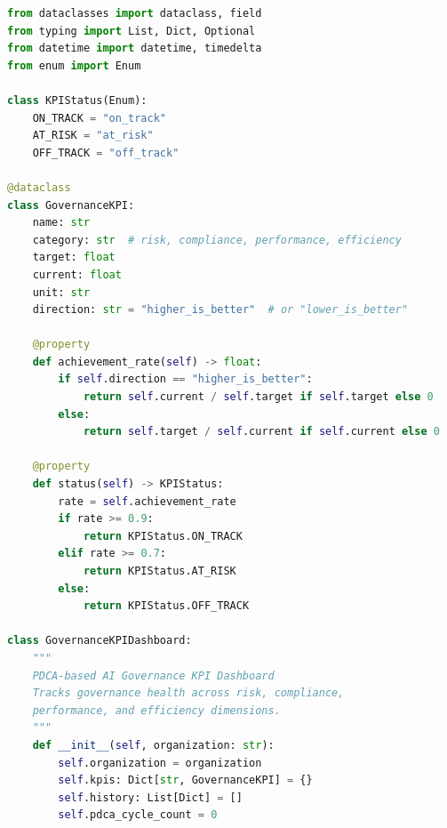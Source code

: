 \begin{lstlisting}[language=Python, caption={AI 거버넌스 KPI 대시보드}, label={lst:kpi_dashboard}]
from dataclasses import dataclass, field
from typing import List, Dict, Optional
from datetime import datetime, timedelta
from enum import Enum

class KPIStatus(Enum):
    ON_TRACK = "on_track"
    AT_RISK = "at_risk"
    OFF_TRACK = "off_track"

@dataclass
class GovernanceKPI:
    name: str
    category: str  # risk, compliance, performance, efficiency
    target: float
    current: float
    unit: str
    direction: str = "higher_is_better"  # or "lower_is_better"

    @property
    def achievement_rate(self) -> float:
        if self.direction == "higher_is_better":
            return self.current / self.target if self.target else 0
        else:
            return self.target / self.current if self.current else 0

    @property
    def status(self) -> KPIStatus:
        rate = self.achievement_rate
        if rate >= 0.9:
            return KPIStatus.ON_TRACK
        elif rate >= 0.7:
            return KPIStatus.AT_RISK
        else:
            return KPIStatus.OFF_TRACK

class GovernanceKPIDashboard:
    """
    PDCA-based AI Governance KPI Dashboard
    Tracks governance health across risk, compliance,
    performance, and efficiency dimensions.
    """
    def __init__(self, organization: str):
        self.organization = organization
        self.kpis: Dict[str, GovernanceKPI] = {}
        self.history: List[Dict] = []
        self.pdca_cycle_count = 0


\end{lstlisting}
